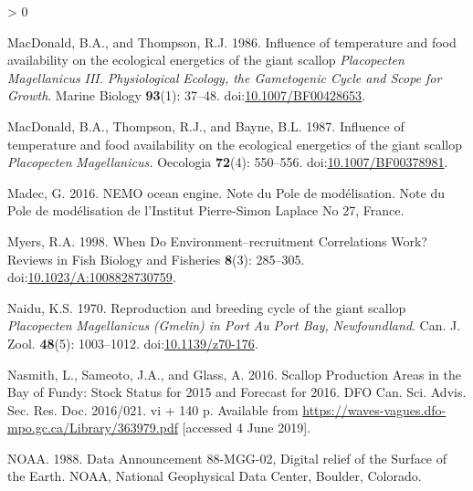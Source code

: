 \documentclass[
]{article}
\newlength{\cslhangindent}
\newenvironment{CSLReferences}[2] %
 {%
  \setlength{\parindent}{0pt}
  \ifodd #1 \everypar{\setlength{\hangindent}{\cslhangindent}}\ignorespaces\fi
  \ifnum #2 > 0
  \setlength{\parskip}{#2\baselineskip}
  \fi
 }%
 {}
\begin{document}
\begin{CSLReferences}{1}{0}
\leavevmode\hypertarget{ref-macdonaldInfluenceTemperatureFood1986}{}%
MacDonald, B.A., and Thompson, R.J. 1986. Influence of temperature and food availability on the ecological energetics of the giant scallop {\emph{Placopecten}}{ \emph{Magellanicus}}{ \emph{\emph{}} }{\emph{\emph{III}}}{\emph{\emph{.}} }{\emph{\emph{Physiological}}}{ \emph{\emph{Ecology, the Gametogenic Cycle and Scope for Growth}}}. Marine Biology \textbf{93}(1): 37--48. doi:\href{https://doi.org/10.1007/BF00428653}{10.1007/BF00428653}.

\leavevmode\hypertarget{ref-macdonaldInfluenceTemperatureFood1987}{}%
MacDonald, B.A., Thompson, R.J., and Bayne, B.L. 1987. Influence of temperature and food availability on the ecological energetics of the giant scallop {\emph{Placopecten}}{ \emph{Magellanicus}}{\emph{\emph{.}}} Oecologia \textbf{72}(4): 550--556. doi:\href{https://doi.org/10.1007/BF00378981}{10.1007/BF00378981}.

\leavevmode\hypertarget{ref-madecNEMOOceanEngine2016}{}%
Madec, G. 2016. {NEMO} ocean engine. {Note} du {Pole} de modélisation. {Note du Pole de modélisation de l'Institut Pierre-Simon Laplace No 27}, {France}.

\leavevmode\hypertarget{ref-myersWhenEnvironmentRecruitment1998}{}%
Myers, R.A. 1998. When {Do Environment}--recruitment {Correlations Work}? Reviews in Fish Biology and Fisheries \textbf{8}(3): 285--305. doi:\href{https://doi.org/10.1023/A:1008828730759}{10.1023/A:1008828730759}.

\leavevmode\hypertarget{ref-naiduReproductionBreedingCycle1970}{}%
Naidu, K.S. 1970. Reproduction and breeding cycle of the giant scallop {\emph{Placopecten}}{ \emph{Magellanicus}}{ \emph{\emph{(}}}{\emph{\emph{Gmelin}}}{\emph{\emph{) in}} }{\emph{\emph{Port}}}{ \emph{\emph{Au}} }{\emph{\emph{Port Bay}}}{\emph{\emph{,}} }{\emph{\emph{Newfoundland}}}. Can. J. Zool. \textbf{48}(5): 1003--1012. doi:\href{https://doi.org/10.1139/z70-176}{10.1139/z70-176}.

\leavevmode\hypertarget{ref-nasmithScallopProductionAreas2016}{}%
Nasmith, L., Sameoto, J.A., and Glass, A. 2016. Scallop {Production Areas} in the {Bay} of {Fundy}: {Stock Status} for 2015 and {Forecast} for 2016. {DFO Can. Sci. Advis. Sec. Res. Doc. 2016/021. vi + 140 p.} Available from \url{https://waves-vagues.dfo-mpo.gc.ca/Library/363979.pdf} {[}accessed 4 June 2019{]}.

\leavevmode\hypertarget{ref-noaaDataAnnouncement88MGG021988}{}%
NOAA. 1988. Data {Announcement} 88-{MGG-02}, {Digital} relief of the {Surface} of the {Earth}. {NOAA, National Geophysical Data Center}, {Boulder, Colorado}.


\end{CSLReferences}
\end{document}

